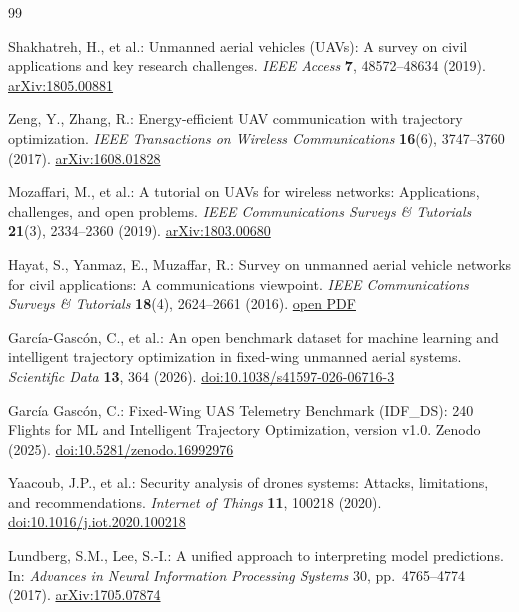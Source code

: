 \documentclass[runningheads,a4paper]{llncs}
\begin{document}
\begin{thebibliography}{99}

Shakhatreh, H., et al.: Unmanned aerial vehicles (UAVs): A survey on civil applications and key research challenges. \textit{IEEE Access} \textbf{7}, 48572--48634 (2019). \href{https://arxiv.org/abs/1805.00881}{arXiv:1805.00881}

Zeng, Y., Zhang, R.: Energy-efficient UAV communication with trajectory optimization. \textit{IEEE Transactions on Wireless Communications} \textbf{16}(6), 3747--3760 (2017). \href{https://arxiv.org/abs/1608.01828}{arXiv:1608.01828}

Mozaffari, M., et al.: A tutorial on UAVs for wireless networks: Applications, challenges, and open problems. \textit{IEEE Communications Surveys \& Tutorials} \textbf{21}(3), 2334--2360 (2019). \href{https://arxiv.org/abs/1803.00680}{arXiv:1803.00680}

Hayat, S., Yanmaz, E., Muzaffar, R.: Survey on unmanned aerial vehicle networks for civil applications: A communications viewpoint. \textit{IEEE Communications Surveys \& Tutorials} \textbf{18}(4), 2624--2661 (2016). \href{https://mobile.aau.at/publications/hayat-2016-COMST-surveyUAV.pdf}{open PDF}

Garc\'ia-Gasc\'on, C., et al.: An open benchmark dataset for machine learning and intelligent trajectory optimization in fixed-wing unmanned aerial systems. \textit{Scientific Data} \textbf{13}, 364 (2026). \href{https://doi.org/10.1038/s41597-026-06716-3}{doi:10.1038/s41597-026-06716-3}

Garc\'ia Gasc\'on, C.: Fixed-Wing UAS Telemetry Benchmark (IDF\_DS): 240 Flights for ML and Intelligent Trajectory Optimization, version v1.0. Zenodo (2025). \href{https://doi.org/10.5281/zenodo.16992976}{doi:10.5281/zenodo.16992976}

Yaacoub, J.P., et al.: Security analysis of drones systems: Attacks, limitations, and recommendations. \textit{Internet of Things} \textbf{11}, 100218 (2020). \href{https://doi.org/10.1016/j.iot.2020.100218}{doi:10.1016/j.iot.2020.100218}

Lundberg, S.M., Lee, S.-I.: A unified approach to interpreting model predictions. In: \textit{Advances in Neural Information Processing Systems} 30, pp.~4765--4774 (2017). \href{https://arxiv.org/abs/1705.07874}{arXiv:1705.07874}


\end{thebibliography}
\end{document}
